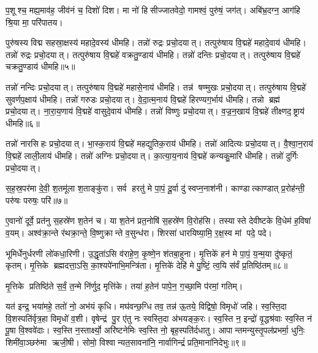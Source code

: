 प॒शूश्च॒ मह्य॒माव॑ह॒ जीव॑नं च॒ दिशो॑ दिश। मा नो॑ हिसीज्जातवेदो॒ गामश्वं॒ पुरु॑षं॒ जग॑त्। अबि॑भ्र॒दग्न॒ आग॑हि श्रि॒या मा॒ परि॑पातय।


 पुरु॑षस्य विद्म सहस्रा॒क्षस्य॑ महादे॒वस्य॑ धीमहि। तन्नो॑ रुद्रः प्रचो॒दयात्। तत्पुरु॑षाय वि॒द्महे॑ महादे॒वाय॑ धीमहि। तन्नो॑ रुद्रः प्रचो॒दयात्। तत्पुरु॑षाय वि॒द्महे॑ वक्रतु॒ण्डाय॑ धीमहि। तन्नो॑ दन्तिः प्रचो॒दयात्। तत्पुरु॑षाय वि॒द्महे॑ चक्रतु॒ण्डाय॑ धीमहि॥५॥

 तन्नो॑ नन्दिः प्रचो॒दयात्। तत्पुरु॑षाय वि॒द्महे॑ महासे॒नाय॑ धीमहि। तन्न॑ षण्मुखः प्रचो॒दयात्। तत्पुरु॑षाय वि॒द्महे॑ सुवर्णप॒क्षाय॑ धीमहि। तन्नो॑ गरुडः प्रचो॒दयात्। वे॒दा॒त्म॒नाय॑ वि॒द्महे॑ हिरण्यग॒र्भाय॑ धीमहि। तन्नो ब्रह्म॑ प्रचो॒दयात्। ना॒रा॒य॒णाय॑ वि॒द्महे॑ वासुदे॒वाय॑ धीमहि। तन्नो॑ विष्णुः प्रचो॒दयात्। व॒ज्र॒न॒खाय॑ वि॒द्महे॑ तीक्ष्णद॒ष्ट्राय॑ धीमहि॥६॥
 
तन्नो॑ नारसिहः प्रचो॒दयात्। भा॒स्क॒राय॑ वि॒द्महे॑ महद्युतिक॒राय॑ धीमहि। तन्नो॑ आदित्यः प्रचो॒दयात्। वै॒श्वा॒न॒राय॑ वि॒द्महे॑ लाली॒लाय॑ धीमहि। तन्नो॑ अग्निः प्रचो॒दयात्। का॒त्या॒य॒नाय॑ वि॒द्महे॑ कन्यकु॒मारि॑ धीमहि। तन्नो॑ दुर्गिः प्रचो॒दयात्। 

स॒ह॒स्र॒पर॑मा दे॒वी॒ श॒तमू॑ला श॒ताङ्कु॑रा। सर्व हरतु॑ मे पा॒पं॒ दू॒र्वा दु॑स्वप्न॒नाश॑नी। काण्डात्काण्डात् प्र॒रोह॑न्ती॒ परु॑षः परुषः॒ परि॑॥७॥

ए॒वानो॑ दूर्वे॒ प्रत॑नु स॒हस्रे॑ण श॒तेन॑ च। या श॒तेन॑ प्रत॒नोषि॑ स॒हस्रे॑ण वि॒रोह॑सि। तस्यास्ते देवीष्टके वि॒धेम॑ ह॒विषा॑ व॒यम्। अश्व॑क्रा॒न्ते र॑थक्रा॒न्ते॒ वि॒ष्णुक्रान्ते व॒सुन्ध॑रा। शिरसा॑ धारयिष्या॒मि॒ र॒क्ष॒स्व मां पदे॒ पदे।

 भूमिर्धेनुर्धरणी लो॑कधा॒रिणी। उ॒द्धृता॑ऽसि व॑राहे॒ण॒ कृ॒ष्णे॒न श॑तबा॒हुना। मृ॒त्तिके॑ हन॑ मे पा॒पं॒ य॒न्म॒या दु॑ष्कृतं॒ कृतम्। मृ॒त्तिके ब्रह्मदत्ता॒ऽसि॒ का॒श्यपे॑नाभि॒मन्त्रि॑ता। मृ॒त्तिके॑ देहि॑ मे पु॒ष्टिं॒ त्व॒यि स॑र्वं प्र॒तिष्ठि॑तम्॥८॥
 
 मृ॒त्तिके प्रतिष्ठि॑ते स॒र्वं॒ त॒न्मे नि॑र्णुद॒ मृत्ति॑के। तया॑ ह॒तेन॑ पापे॒न॒ ग॒च्छा॒मि प॑रमां॒ गतिम्।

यत॑ इन्द्र॒ भया॑महे॒ ततो॑ नो॒ अभ॑यं कृधि। मघ॑वन्छ॒ग्धि तव॒ तन्न॑ ऊ॒तये॒ विद्विषो॒ विमृधो॑ जहि। स्व॒स्ति॒दा वि॒शस्पति॑र्वृत्र॒हा विमृधो॑ व॒शी। वृषेन्द्र॑ पु॒र ए॑तु नः स्वस्ति॒दा अ॑भयङ्क॒रः। स्व॒स्ति न॒ इन्द्रो॑ वृ॒द्धश्र॑वाः स्व॒स्ति न॑ पू॒षा वि॒श्ववे॑दाः। स्व॒स्ति न॒स्तार्क्ष्यो॒ अरि॑ष्टनेमिः स्व॒स्ति नो॒ बृह॒स्पति॑र्दधातु। आपान्तमन्युस्तृ॒पल॑प्रभर्मा॒ धुनिः॒ शिमी॑वा॒ञ्छरु॑मा ऋजी॒षी। सोमो॒ विश्वान्यत॒सावना॑नि॒ नार्वागिन्द्रं॑ प्रति॒माना॑निदेभुः॥९॥

